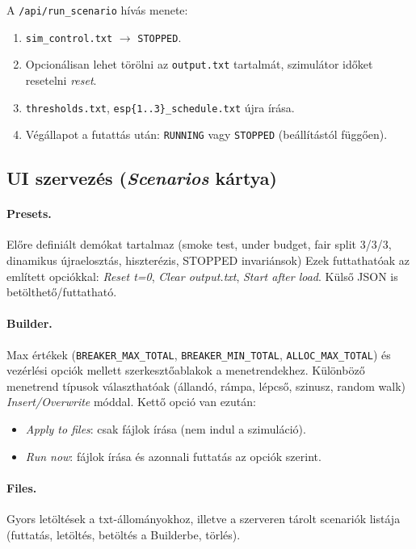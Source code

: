 A \verb|/api/run_scenario| hívás menete:
\begin{enumerate}
  \item \texttt{sim\_control.txt} \(\rightarrow\) \texttt{STOPPED}.
  \item Opcionálisan lehet törölni az \texttt{output.txt} tartalmát, szimulátor időket resetelni \emph{reset}.
  \item \texttt{thresholds.txt}, \texttt{esp\{1..3\}\_schedule.txt} újra írása.
  \item Végállapot a futattás után: \texttt{RUNNING} vagy \texttt{STOPPED} (beállítástól függően).
\end{enumerate}

\subsection{UI szervezés (\emph{Scenarios} kártya)}
\paragraph{Presets.} Előre definiált demókat tartalmaz (smoke test, under budget, fair split 3/3/3, 
dinamikus újraelosztás, hiszterézis, STOPPED invariánsok) Ezek futtathatóak az említett opciókkal: 
\emph{Reset t=0}, \emph{Clear output.txt}, \emph{Start after load}. Külső JSON is betölthető/futtatható.

\paragraph{Builder.} Max értékek (\texttt{BREAKER\_MAX\_TOTAL}, \texttt{BREAKER\_MIN\_TOTAL}, 
\texttt{ALLOC\_MAX\_TOTAL}) és vezérlési opciók mellett szerkesztőablakok a
menetrendekhez. Különböző menetrend típusok választhatóak 
(állandó, rámpa, lépcső, szinusz, random walk) \emph{Insert/Overwrite} móddal.
Kettő opció van ezután:
\begin{itemize}
  \item \emph{Apply to files}: csak fájlok írása (nem indul a szimuláció).
  \item \emph{Run now}: fájlok írása és azonnali futtatás az opciók szerint.
\end{itemize}

\paragraph{Files.} Gyors letöltések a txt-állományokhoz, illetve a szerveren tárolt 
scenariók listája (futtatás, letöltés, betöltés a Builderbe, törlés).

